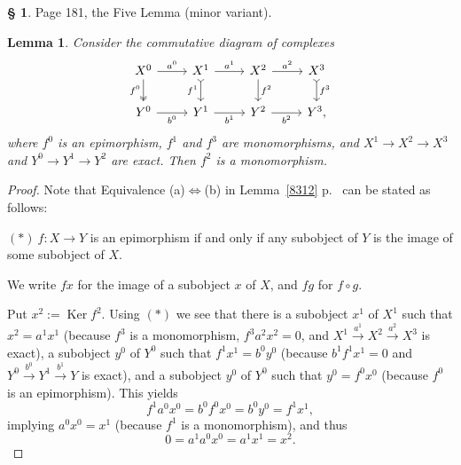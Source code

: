 \documentclass[12pt]{article}%
\newtheorem{lem}[thm]{Lemma}
\theoremstyle{remark}
\theoremstyle{definition}
\newtheorem{s}[thm]{\S}%
\newcommand{\nn}{\noindent}
\newcommand{\ssi}{\Leftrightarrow}%
\newcommand{\xr}{\xrightarrow}
\DeclareMathOperator{\Ker}{Ker}
\begin{document}

\begin{s} 
Page 181, the Five Lemma (minor variant). 

\begin{lem} 
Consider the commutative diagram of complexes 
$$
\begin{tikzcd}
X^0\arrow[two heads]{d}[swap]{f^0}\arrow{r}{a^0}&
X^1\arrow[tail]{d}[swap]{f^1}\arrow{r}{a^1}&
X^2\arrow{d}{f^2}\arrow{r}{a^2}&
X^3\arrow[tail]{d}{f^3}\\ 
Y^0\arrow{r}[swap]{b^0}&
Y^1\arrow{r}[swap]{b^1}&
Y^2\arrow{r}[swap]{b^2}&
Y^3,
\end{tikzcd}
$$
where $f^0$ is an epimorphism, $f^1$ and $f^3$ are monomorphisms, and $X^1\to X^2\to X^3$ and $Y^0\to Y^1\to Y^2$ are exact. Then $f^2$ is a monomorphism. 
\end{lem} 

\begin{proof}
Note that Equivalence (a)$\ssi$(b) in Lemma~\ref{8312} p.~\pageref{8312} can be stated as follows: 

\nn$(*)\ f:X\to Y$ is an epimorphism if and only if any subobject of $Y$ is the image of some subobject of $X$. 

We write $fx$ for the image of a subobject $x$ of $X$, and $fg$ for $f\circ g$.

Put $x^2:=\Ker f^2$. Using $(*)$ we see that there is a subobject $x^1$ of $X^1$ such that $x^2=a^1x^1$ (because $f^3$ is a monomorphism, $f^3a^2x^2=0$, and $X^1\xr{a^1}X^2\xr{a^2}X^3$ is exact), a subobject $y^0$ of $Y^0$ such that $f^1x^1=b^0y^0$ (because $b^1f^1x^1=0$ and $Y^0\xr{b^0}Y^1\xr{b^1}Y$ is exact), and a subobject $y^0$ of $Y^0$ such that $y^0=f^0x^0$ (because $f^0$ is an epimorphism). This yields 
$$
f^1a^0x^0=b^0f^0x^0=b^0y^0=f^1x^1,
$$
implying $a^0x^0=x^1$ (because $f^1$ is a monomorphism), and thus 
$$
0=a^1a^0x^0=a^1x^1=x^2.
$$
\end{proof}
\end{s}

%
\end{document}
